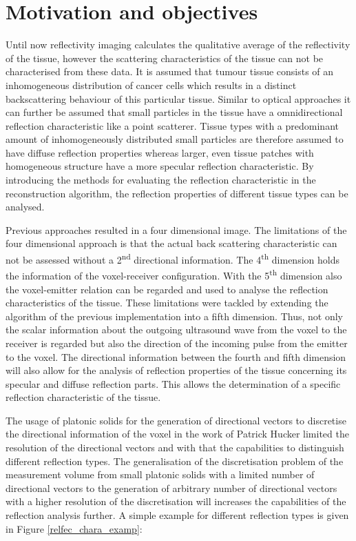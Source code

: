 \section{Motivation and objectives}
\label{chap:motivation}


Until now reflectivity imaging calculates the qualitative average of the reflectivity of the tissue, however the scattering characteristics of the tissue can not be characterised from these data. It is assumed that tumour tissue consists of an inhomogeneous distribution of cancer cells which results in a distinct backscattering behaviour of this particular tissue. Similar to optical approaches it can further be assumed that small particles in the tissue have a omnidirectional reflection characteristic like a point scatterer. Tissue types with a predominant amount of inhomogeneously distributed small particles are therefore assumed to have diffuse reflection properties whereas larger, even tissue patches with homogeneous structure have a more specular reflection characteristic.
By introducing the methods for evaluating the reflection characteristic in the reconstruction algorithm, the reflection properties of different tissue types can be analysed.


Previous approaches resulted in a four dimensional image. The limitations of the four dimensional approach is that the actual back scattering characteristic can not be assessed without a 2\textsuperscript{nd} directional information. The 4\textsuperscript{th} dimension holds the information of the voxel-receiver configuration. With the 5\textsuperscript{th} dimension also the voxel-emitter relation can be regarded and used to analyse the reflection characteristics of the tissue. These limitations were tackled by extending the algorithm of the previous implementation into a fifth dimension. Thus, not only the scalar information about the outgoing ultrasound wave from the voxel to the receiver is regarded but also the direction of the incoming pulse from the emitter to the voxel. The directional information between the fourth and fifth dimension will also allow for the analysis of reflection properties of the tissue concerning its specular and diffuse reflection parts. This allows the determination of a specific reflection characteristic of the tissue.

The usage of platonic solids for the generation of directional vectors to discretise the directional information of the voxel in the work of Patrick Hucker \cite{PatrickHucker2014EvaluationRuckstreumodells} limited the resolution of the directional vectors and with that the capabilities to distinguish different reflection types. The generalisation of the discretisation problem of the measurement volume from small platonic solids with a limited number of directional vectors to the generation of arbitrary number of directional vectors with a higher resolution of the discretisation will increases the capabilities of the reflection analysis further. A simple example for different reflection types is given in Figure
\ref{relfec_chara_examp}:

